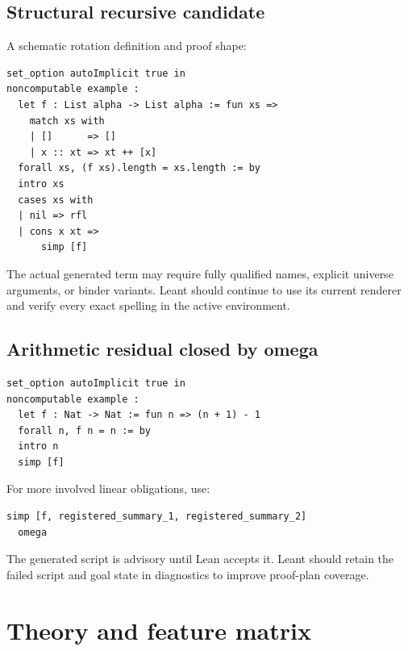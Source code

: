 \documentclass[11pt,oneside]{article}
\begin{document}
\subsection{Structural recursive candidate}

A schematic rotation definition and proof shape:

\begin{lstlisting}[language=Lean]
set_option autoImplicit true in
noncomputable example :
  let f : List alpha -> List alpha := fun xs =>
    match xs with
    | []      => []
    | x :: xt => xt ++ [x]
  forall xs, (f xs).length = xs.length := by
  intro xs
  cases xs with
  | nil => rfl
  | cons x xt =>
      simp [f]
\end{lstlisting}

The actual generated term may require fully qualified names, explicit universe
arguments, or binder variants. Leant should continue to use its current renderer and
verify every exact spelling in the active environment.

\subsection{Arithmetic residual closed by omega}

\begin{lstlisting}[language=Lean]
set_option autoImplicit true in
noncomputable example :
  let f : Nat -> Nat := fun n => (n + 1) - 1
  forall n, f n = n := by
  intro n
  simp [f]
\end{lstlisting}

For more involved linear obligations, use:

\begin{lstlisting}[language=Lean]
  simp [f, registered_summary_1, registered_summary_2]
  omega
\end{lstlisting}

The generated script is advisory until Lean accepts it. Leant should retain the failed
script and goal state in diagnostics to improve proof-plan coverage.

\section{Theory and feature matrix}
\end{document}
